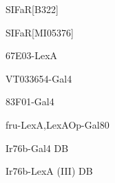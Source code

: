 \documentclass[17pt]{extarticle}
\begin{document}
\footnotesize
\vspace*{\fill}
\newpage{}
\vspace*{\fill}\begin{normalsize}
SIFaR[B322] \\[0.5em]
\end{normalsize}
\footnotesize
\vspace*{\fill}
\newpage{}
\vspace*{\fill}\begin{normalsize}
SIFaR[MI05376] \\[0.5em]
\end{normalsize}
\footnotesize
\vspace*{\fill}
\newpage{}
\vspace*{\fill}\begin{large}
67E03-LexA \\[0.5em]
\end{large}
\footnotesize
\vspace*{\fill}
\newpage{}
\vspace*{\fill}\begin{normalsize}
VT033654-Gal4 \\[0.5em]
\end{normalsize}
\footnotesize
\vspace*{\fill}
\newpage{}
\vspace*{\fill}\begin{large}
83F01-Gal4 \\[0.5em]
\end{large}
\footnotesize
\vspace*{\fill}
\newpage{}
\vspace*{\fill}\begin{footnotesize}
fru-LexA,LexAOp-Gal80 \\[0.5em]
\end{footnotesize}
\footnotesize
\vspace*{\fill}
\newpage{}
\vspace*{\fill}\begin{normalsize}
Ir76b-Gal4 DB \\[0.5em]
\end{normalsize}
\footnotesize
\vspace*{\fill}
\newpage{}
\vspace*{\fill}\begin{small}
Ir76b-LexA (III) DB \\[0.5em]
\end{small}
\footnotesize
\vspace*{\fill}
\end{document}
